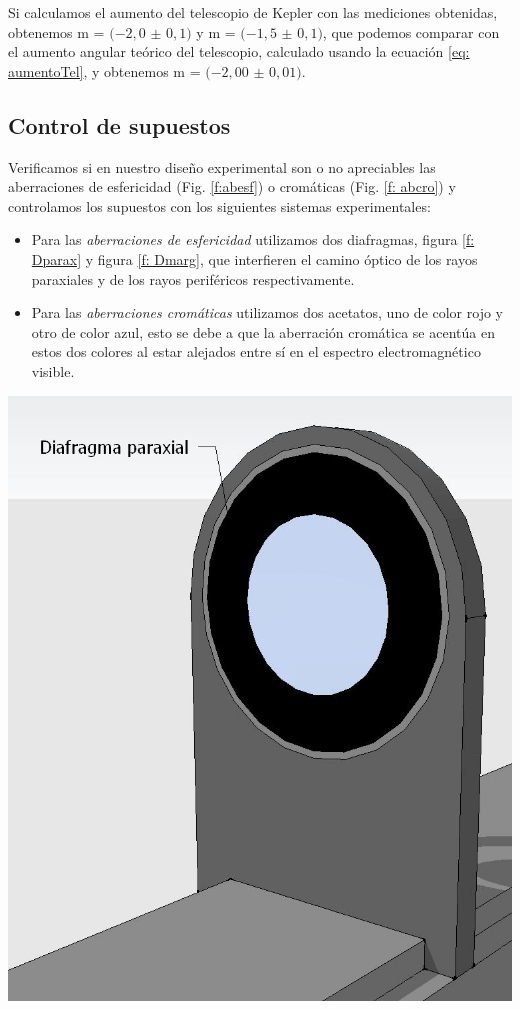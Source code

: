 \documentclass[a4paper,12pt]{article}
\newenvironment{Figure}
  {\par\medskip\noindent\minipage{\linewidth}}
  {\endminipage\par\medskip}
\begin{document}
\begin{multicols*}{2}
        Si calculamos el aumento del telescopio de Kepler con las mediciones obtenidas, obtenemos m = $(-2,0$ $\pm$ $0,1)$ y m = $(-1,5$ $\pm$ $0,1)$, que podemos comparar con el aumento angular teórico del telescopio, calculado usando la ecuación \ref{eq: aumentoTel}, y obtenemos m = $(-2,00$ $\pm$ $0,01)$.

    \subsection*{Control de supuestos}

        Verificamos si en nuestro diseño experimental son o no apreciables las aberraciones de esfericidad (Fig. \ref{f:abesf}) o cromáticas (Fig. \ref{f: abcro}) y controlamos los supuestos con los siguientes sistemas experimentales:

        \begin{itemize}
            \item Para las \emph{aberraciones de esfericidad} utilizamos dos diafragmas, figura \ref{f: Dparax} y figura \ref{f: Dmarg}, que interfieren el camino óptico de los rayos paraxiales y de los rayos periféricos respectivamente.
            \item Para las \emph{aberraciones cromáticas} utilizamos dos acetatos, uno de color rojo y otro de color azul, esto se debe a que la aberración cromática se acentúa en estos dos colores al estar alejados entre sí en el espectro electromagnético visible.
        \end{itemize}

        \begin{Figure}
            \centering
            \includegraphics[width=0.7\linewidth]{DiafragmaParaxial.jpg}
            \label{f: Dparax}
        \end{Figure}


\end{multicols*}
\end{document}
